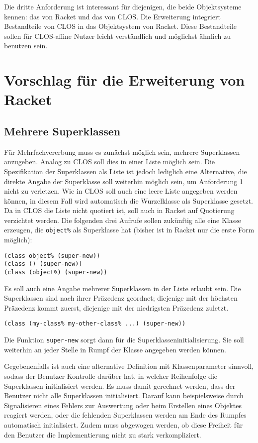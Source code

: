 Die dritte Anforderung ist interessant für diejenigen, die beide Objektsysteme kennen: das von Racket und das von CLOS. Die Erweiterung integriert Bestandteile von CLOS in das Objektsystem von Racket. Diese Bestandteile sollen für CLOS-affine Nutzer leicht verständlich und möglichst ähnlich zu benutzen sein.

\section{Vorschlag für die Erweiterung von Racket}

\subsection{Mehrere Superklassen}
Für Mehrfachvererbung muss es zunächst möglich sein, mehrere Superklassen anzugeben. Analog zu CLOS soll dies in einer Liste möglich sein. Die Spezifikation der Superklassen als Liste ist jedoch lediglich eine Alternative, die direkte Angabe der Superklasse soll weiterhin möglich sein, um Anforderung 1 nicht zu verletzen. Wie in CLOS soll auch eine leere Liste angegeben werden können, in diesem Fall wird automatisch die Wurzelklasse als Superklasse gesetzt. Da in CLOS die Liste nicht quotiert ist, soll auch in Racket auf Quotierung verzichtet werden. Die folgenden drei Aufrufe sollen zukünftig alle eine Klasse erzeugen, die \texttt{object\%} als Superklasse hat (bisher ist in Racket nur die erste Form möglich):

\begin{lstlisting}
(class object% (super-new))
(class () (super-new))
(class (object%) (super-new))
\end{lstlisting}

Es soll auch eine Angabe mehrerer Superklassen in der Liste erlaubt sein. Die Superklassen sind nach ihrer Präzedenz geordnet; diejenige mit der höchsten Präzedenz kommt zuerst, diejenige mit der niedrigsten Präzedenz zuletzt. 

\begin{lstlisting}
(class (my-class% my-other-class% ...) (super-new)) 
\end{lstlisting}

Die Funktion \texttt{super-new} sorgt dann für die Superklasseninitialisierung. Sie soll weiterhin an jeder Stelle in Rumpf der Klasse angegeben werden können. 

Gegebenenfalls ist auch eine alternative Definition mit Klassenparameter sinnvoll, sodass der Benutzer Kontrolle darüber hat, in welcher Reihenfolge die Superklassen initialisiert werden. Es muss damit gerechnet werden, dass der Benutzer nicht alle Superklassen initialisiert. Darauf kann beispielsweise durch Signalisieren eines Fehlers zur Auswertung oder beim Erstellen eines Objektes reagiert werden, oder die fehlenden Superklassen werden am Ende des Rumpfes automatisch initialisiert. Zudem muss abgewogen werden, ob diese Freiheit für den Benutzer die Implementierung nicht zu stark verkompliziert.


